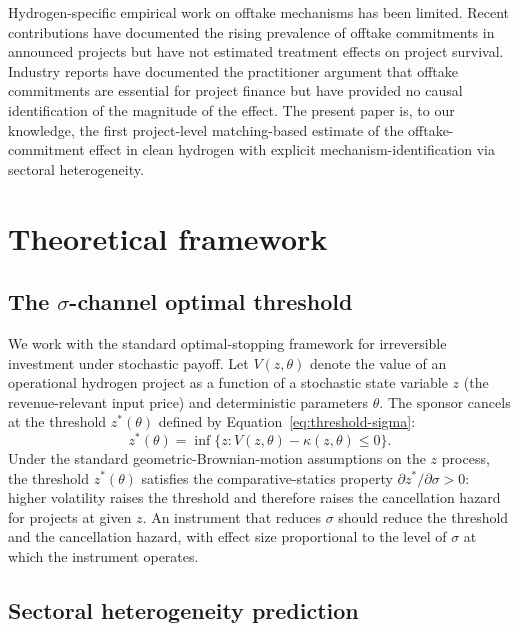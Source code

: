 \documentclass[12pt,a4paper]{article}
\theoremstyle{plain}
\theoremstyle{definition}
\begin{document}
Hydrogen-specific empirical work on offtake mechanisms has been limited. Recent contributions \cite{hauenstein2024technological, oei2024global} have documented the rising prevalence of offtake commitments in announced projects but have not estimated treatment effects on project survival. Industry reports \cite{agora2025outlook, hydrogen2024insights} have documented the practitioner argument that offtake commitments are essential for project finance but have provided no causal identification of the magnitude of the effect. The present paper is, to our knowledge, the first project-level matching-based estimate of the offtake-commitment effect in clean hydrogen with explicit mechanism-identification via sectoral heterogeneity.

\section{Theoretical framework}
\label{sec:framework}

\subsection{The $\sigma$-channel optimal threshold}
\label{sec:framework-sigma}

We work with the standard optimal-stopping framework for irreversible investment under stochastic payoff. Let $V(z, \theta)$ denote the value of an operational hydrogen project as a function of a stochastic state variable $z$ (the revenue-relevant input price) and deterministic parameters $\theta$. The sponsor cancels at the threshold $z^{*}(\theta)$ defined by Equation~\eqref{eq:threshold-sigma}:
\begin{equation}
z^{*}(\theta) = \inf\big\{ z : V(z, \theta) - \kappa(z, \theta) \leq 0 \big\}.
\label{eq:threshold-sigma}
\end{equation}
Under the standard geometric-Brownian-motion assumptions on the $z$ process, the threshold $z^{*}(\theta)$ satisfies the comparative-statics property $\partial z^{*}/\partial \sigma > 0$: higher volatility raises the threshold and therefore raises the cancellation hazard for projects at given $z$. An instrument that reduces $\sigma$ should reduce the threshold and the cancellation hazard, with effect size proportional to the level of $\sigma$ at which the instrument operates.

\subsection{Sectoral heterogeneity prediction}
\label{sec:framework-heterogeneity}
\end{document}

